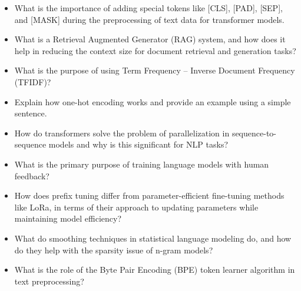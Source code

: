 

{
	
   	\begin{tcolorbox}[skin=widget,
    	coltitle=black,
    	colframe=s-group1!30,
    	colback=s-group1!10,
    	fontupper=\footnotesize,
    	adjusted title=Group 1,
    	boxrule=2mm]
	   	\begin{itemize}
	   		\setlength\itemsep{-0.2em}
			\item What is the importance of adding special tokens like [CLS], [PAD], [SEP], and [MASK] during the preprocessing of text data for transformer models.
			\item What is a Retrieval Augmented Generator (RAG) system, and how does it help in reducing the context size for document retrieval and generation tasks?
			\item What is the purpose of using Term Frequency – Inverse Document Frequency (TFIDF)?
	 	\end{itemize}
    \end{tcolorbox}
       	
    \begin{tcolorbox}[skin=widget,
    	coltitle=black,
    	colframe=s-group2!30,
    	colback=s-group2!10,
    	fontupper=\footnotesize,
    	adjusted title=Group 2,
    	boxrule=2mm]
    	\begin{itemize}
	   		\setlength\itemsep{-0.2em}
    		\item Explain how one-hot encoding works and provide an example using a simple sentence.
    		\item How do transformers solve the problem of parallelization in sequence-to-sequence models and why is this significant for NLP tasks?
    		\item What is the primary purpose of training language models with human feedback?
    	\end{itemize}
    \end{tcolorbox}
   	
   	\begin{tcolorbox}[skin=widget,
    	coltitle=black,
    	colframe=s-group3!30,
    	colback=s-group3!10,
    	fontupper=\footnotesize,
    	adjusted title=Group 3,
    	boxrule=2mm]
    	\begin{itemize}
	   		\setlength\itemsep{-0.2em}
    		\item How does prefix tuning differ from parameter-efficient fine-tuning methods like LoRa, in terms of their approach to updating parameters while maintaining model efficiency?
			\item What do smoothing techniques in statistical language modeling do, and how do they help with the sparsity issue of n-gram models?
			\item What is the role of the Byte Pair Encoding (BPE) token learner algorithm in text preprocessing?


\end{itemize}
\end{tcolorbox}}
